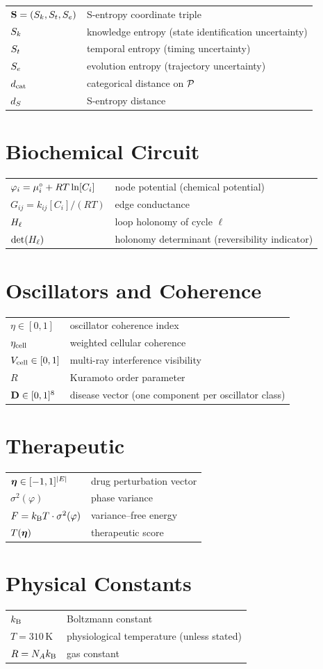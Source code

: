 \begin{tabular}{ll}
$\mathbf{S} = (S_k,S_t,S_e)$ & S-entropy coordinate triple \\
$S_k$ & knowledge entropy (state identification uncertainty) \\
$S_t$ & temporal entropy (timing uncertainty) \\
$S_e$ & evolution entropy (trajectory uncertainty) \\
$d_{\mathrm{cat}}$ & categorical distance on $\mathcal{P}$ \\
$d_S$ & S-entropy distance \\
\end{tabular}

\section*{Biochemical Circuit}

\begin{tabular}{ll}
$\varphi_i = \mu_i^\circ + RT\ln[C_i]$ & node potential (chemical potential) \\
$G_{ij} = k_{ij}[C_i]/(RT)$ & edge conductance \\
$H_\ell$ & loop holonomy of cycle $\ell$ \\
$\det(H_\ell)$ & holonomy determinant (reversibility indicator) \\
\end{tabular}

\section*{Oscillators and Coherence}

\begin{tabular}{ll}
$\eta \in [0,1]$ & oscillator coherence index \\
$\eta_{\mathrm{cell}}$ & weighted cellular coherence \\
$V_{\mathrm{cell}} \in [0,1]$ & multi-ray interference visibility \\
$R$ & Kuramoto order parameter \\
$\mathbf{D} \in [0,1]^8$ & disease vector (one component per oscillator class) \\
\end{tabular}

\section*{Therapeutic}

\begin{tabular}{ll}
$\boldsymbol{\eta} \in [-1,1]^{|E|}$ & drug perturbation vector \\
$\sigma^2(\varphi)$ & phase variance \\
$F = k_{\mathrm{B}} T \cdot \sigma^2(\varphi)$ & variance--free energy \\
$T(\boldsymbol{\eta})$ & therapeutic score \\
\end{tabular}

\section*{Physical Constants}

\begin{tabular}{ll}
$k_{\mathrm{B}}$ & Boltzmann constant \\
$T = 310\,\mathrm{K}$ & physiological temperature (unless stated) \\
$R = N_A k_{\mathrm{B}}$ & gas constant \\
\end{tabular}
